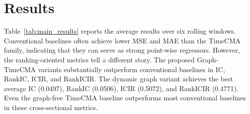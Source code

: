 \documentclass[runningheads]{llncs}
\begin{document}
\begin{table}[t]
\centering
\small
\caption{Comparison with conventional baselines and TimeCMA-family models on HS300 rolling-window prediction. Best results are shown in bold. Lower is better for MSE and MAE; higher is better for IC, RankIC, ICIR, and RankICIR.}
\label{tab:main_results}
\end{table}

\section{Results}

Table~\ref{tab:main_results} reports the average results over six rolling windows. Conventional baselines often achieve lower MSE and MAE than the TimeCMA family, indicating that they can serve as strong point-wise regressors. However, the ranking-oriented metrics tell a different story. The proposed Graph-TimeCMA variants substantially outperform conventional baselines in IC, RankIC, ICIR, and RankICIR. The dynamic graph variant achieves the best average IC (0.0497), RankIC (0.0506), ICIR (0.5072), and RankICIR (0.4771). Even the graph-free TimeCMA baseline outperforms most conventional baselines in these cross-sectional metrics.
\end{document}
